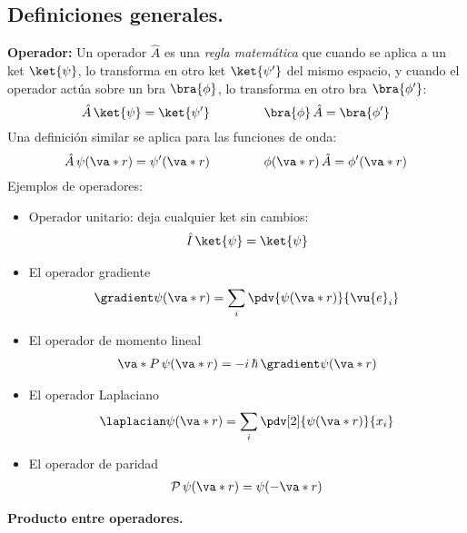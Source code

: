 \subsection{Definiciones generales.}
\textbf{Operador: } Un operador $\hat{A}$ es una \emph{regla matemática} que cuando se aplica a un ket $\ket{\psi}$, lo transforma en otro ket $\ket{\psi^{\prime}}$ del mismo espacio, y cuando el operador actúa sobre un bra $\bra{\phi}$, lo transforma en otro bra $\bra{\phi^{\prime}}$:
\begin{equation}
\hat{A} \, \ket{\psi} = \ket{\psi^{\prime}} \hspace{1.5cm} \bra{\phi} \, \hat{A} = \bra{\phi^{\prime}}
\label{eq:ecuacion_02_51}
\end{equation}
Una definición similar se aplica para las funciones de onda:
\begin{equation}
\hat{A} \, \psi(\va*{r}) =  \psi^{\prime} (\va*{r}) \hspace{1.5cm} \phi(\va*{r}) \, \hat{A} =  \phi^{\prime} (\va*{r})
\label{eq:ecuacion_02_52}
\end{equation}
Ejemplos de operadores:
\begin{itemize}
\item Operador unitario: deja cualquier ket sin cambios:
\begin{align*}
\hat{I} \, \ket{\psi} = \ket{\psi}
\end{align*}
\item El operador gradiente
\begin{align*}
\gradient \psi(\va*{r}) = \sum_{i} \pdv{\psi(\va*{r})}{\vu{e}_{i}}
\end{align*}
\item El operador de momento lineal
\begin{align*}
\va*{P} \, \psi(\va*{r}) =  - i \, \hbar \, \gradient \psi(\va*{r})
\end{align*}
\item El operador Laplaciano
\begin{align*}
\laplacian \psi(\va*{r}) = \sum_{i} \pdv[2]{\psi(\va*{r})}{x_{i}}
\end{align*}
\item El operador de paridad
\begin{align*}
\mathcal{P} \, \psi(\va*{r}) = \psi(- \va*{r}) 
\end{align*}
\end{itemize}

\textbf{Producto entre operadores.}

